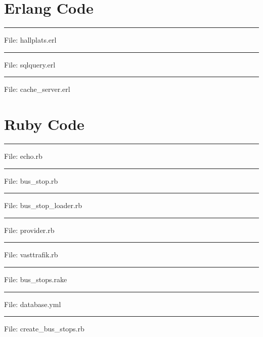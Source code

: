 \appendix

\chapter{Erlang Code}
\label{cha:erlang}

\noindent
\rule{2cm}{0.5pt} File: hallplats.erl \hrulefill


\clearpage
\noindent
\rule{2cm}{0.5pt} File: sqlquery.erl \hrulefill


\clearpage
\noindent
\rule{2cm}{0.5pt} File: cache\_server.erl \hrulefill


\chapter{Ruby Code}
\label{cha:ruby}

\noindent
\rule{2cm}{0.5pt} File: echo.rb \hrulefill


\noindent
\rule{2cm}{0.5pt} File: bus\_stop.rb \hrulefill


\noindent
\rule{2cm}{0.5pt} File: bus\_stop\_loader.rb \hrulefill


\clearpage
\noindent
\rule{2cm}{0.5pt} File: provider.rb \hrulefill


\clearpage
\noindent
\rule{2cm}{0.5pt} File: vasttrafik.rb \hrulefill


\noindent
\rule{2cm}{0.5pt} File: bus\_stops.rake \hrulefill


\noindent
\rule{2cm}{0.5pt} File: database.yml \hrulefill


\clearpage
\noindent
\rule{2cm}{0.5pt} File: create\_bus\_stops.rb \hrulefill





